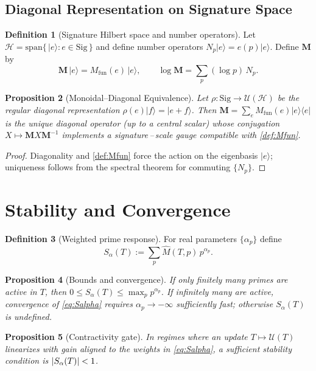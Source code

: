 \documentclass[11pt]{article}
\theoremstyle{definition}
\newtheorem{definition}{Definition}[section]
\theoremstyle{plain}
\newtheorem{proposition}[definition]{Proposition}
\theoremstyle{remark}
\newcommand{\Sig}{\mathrm{Sig}}
\newcommand{\Hcal}{\mathcal{H}}
\newcommand{\Mfun}{M_{\mathrm{fun}}}
\newcommand{\Mhat}{\widehat{M}}
\DeclarePairedDelimiter{\abs}{\lvert}{\rvert}
\begin{document}
\subsection{Diagonal Representation on Signature Space}
\begin{definition}[Signature Hilbert space and number operators]
Let $\Hcal=\mathrm{span}\{\,|e\rangle: e\in\Sig\,\}$ and define number operators $N_p|e\rangle=e(p)|e\rangle$. Define $\mathbf M$ by
\begin{equation}\label{eq:diagM}
\mathbf M\,|e\rangle=\Mfun(e)\,|e\rangle,\qquad \log\mathbf M=\sum_p (\log p)\,N_p.
\end{equation}
\end{definition}
\begin{proposition}[Monoidal–Diagonal Equivalence]\label{prop:gauge}
Let $\rho: \Sig\to\mathcal U(\Hcal)$ be the regular diagonal representation $\rho(e)|f\rangle=|e+f\rangle$. Then $\mathbf M=\sum_e \Mfun(e)|e\rangle\langle e|$ is the unique diagonal operator (up to a central scalar) whose conjugation $X\mapsto \mathbf M X \mathbf M^{-1}$ implements a signature\,–\,scale gauge compatible with \cref{def:Mfun}.
\end{proposition}
\begin{proof} Diagonality and \cref{def:Mfun} force the action on the eigenbasis $|e\rangle$; uniqueness follows from the spectral theorem for commuting $\{N_p\}$.\end{proof}

\section{Stability and Convergence}
\begin{definition}[Weighted prime response]
For real parameters $\{\alpha_p\}$ define
\begin{equation}\label{eq:Salpha}
S_{\alpha}(T):=\sum_p \Mhat(T,p)\,p^{\alpha_p}.
\end{equation}
\end{definition}
\begin{proposition}[Bounds and convergence]\label{prop:bounds}
If only finitely many primes are active in $T$, then $0\le S_{\alpha}(T)\le \max_p p^{\alpha_p}$. If infinitely many are active, convergence of \cref{eq:Salpha} requires $\alpha_p\to-\infty$ sufficiently fast; otherwise $S_{\alpha}(T)$ is undefined.
\end{proposition}
\begin{proposition}[Contractivity gate]\label{prop:contract}
In regimes where an update $T\mapsto \mathcal U(T)$ linearizes with gain aligned to the weights in \cref{eq:Salpha}, a sufficient stability condition is $\abs{S_{\alpha}(T)}<1$.
\end{proposition}
\end{document}
